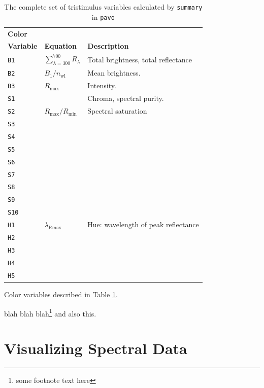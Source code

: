\documentclass{article}
\newcommand{\pavo}{{\tt pavo}}  %
\newcommand{\code}[1]{{\tt #1}}  %
\begin{document}
\begin{table}[h]
\begin{center}
\begin{tabular}{l l l} \hline
{\bf Color} & \\
{\bf Variable} & {\bf Equation} & {\bf Description} \\ 
\hline
\code{B1} & {$\sum_{\lambda={300}}^{700} R_\lambda$} & \parbox[t]{3in}{Total brightness, total reflectance}  \\
\code{B2} & {$B_\text{1}/n_\text{wl}$} & \parbox[t]{3in}{Mean brightness.} \\
\code{B3} & {$R_\text{max}$} & \parbox[t]{3in}{Intensity.} \\
\code{S1} & {} & \parbox[t]{3in}{Chroma, spectral purity.} \\
\code{S2} & {$R_\text{max}/R_\text{min}$} & \parbox[t]{3in}{Spectral saturation} \\
\code{S3} & {} & \parbox[t]{3in}{} \\
\code{S4} & {} & \parbox[t]{3in}{} \\
\code{S5} & {} & \parbox[t]{3in}{} \\
\code{S6} & {} & \parbox[t]{3in}{} \\
\code{S7} & {} & \parbox[t]{3in}{} \\
\code{S8} & {} & \parbox[t]{3in}{} \\
\code{S9} & {} & \parbox[t]{3in}{} \\
\code{S10} & {} & \parbox[t]{3in}{} \\
\code{H1} & {$\lambda_\text{Rmax}$} & \parbox[t]{3in}{Hue: wavelength of peak reflectance} \\
\code{H2} & {} & \parbox[t]{3in}{} \\
\code{H3} & {} & \parbox[t]{3in}{} \\
\code{H4} & {} & \parbox[t]{3in}{} \\
\code{H5} & {} & \parbox[t]{3in}{} \\
\hline
\end{tabular}
\end{center}
\caption{\label{table:tristim}
The complete set of tristimulus variables calculated by \code{summary} in \pavo{}}
\end{table}

Color variables described in Table \ref{table:tristim}.

blah blah blah\footnote{some footnote text here} and also this.

\section{Visualizing Spectral Data}
\end{document}

